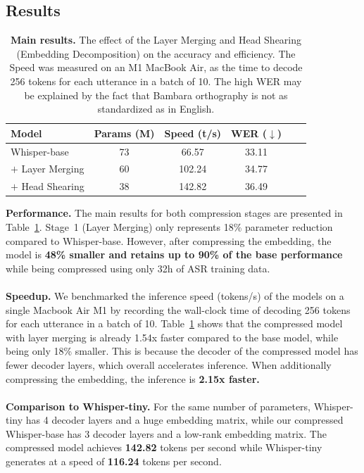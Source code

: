 \documentclass{article}
\newcommand{\myparagraph}[1]{\noindent\textbf{#1}}
\begin{document}
{\subsection{Results}

\begin{table}[ht]
    \centering
    \begin{tabular}{lccccc}
    \toprule
    \textbf{Model} & \textbf{Params (M)} & \textbf{Speed (t/s)} & \textbf{WER ($\downarrow$)} \\
    \midrule
    Whisper-base  & 73 & 66.57 & 33.11 \\
    $+$ Layer Merging & 60 & 102.24 & 34.77 \\
    $+$ Head Shearing & 38 & 142.82 & 36.49 \\
    \bottomrule
\end{tabular}
\caption{\textbf{Main results.} The effect of the Layer Merging and Head Shearing (Embedding Decomposition) on the accuracy and efficiency. The Speed was measured on an M1 MacBook Air, as the time to decode 256 tokens for each utterance in a batch of 10. The high WER may be explained by the fact that Bambara orthography is not as standardized as in English.}
\label{tab:results}
\end{table}

\myparagraph{Performance.} The main results for both compression stages are presented in Table~\ref{tab:results}. Stage~1 (Layer Merging) only represents 18\% parameter reduction compared to Whisper-base. However, after compressing the embedding, the model is \textbf{48\% smaller and retains up to 90\% of the base performance} while being compressed using only 32h of ASR training data.
\\
\\
\myparagraph{Speedup.} We benchmarked the inference speed (tokens/s) of the models on a single Macbook Air M1 by recording the wall-clock time of decoding 256 tokens for each utterance in a batch of 10. Table~\ref{tab:results} shows that the compressed model with layer merging is already 1.54x faster compared to the base model, while being only 18\% smaller. This is because the decoder of the compressed model has fewer decoder layers, which overall accelerates inference. When additionally compressing the embedding, the inference is \textbf{2.15x faster.}
\\
\\
\myparagraph{Comparison to Whisper-tiny.} For the same number of parameters, Whisper-tiny has 4 decoder layers and a huge embedding matrix, while our compressed Whisper-base has 3 decoder layers and a low-rank embedding matrix. The compressed model achieves \textbf{142.82} tokens per second while Whisper-tiny generates at a speed of \textbf{116.24} tokens per second.

}
\end{document}
